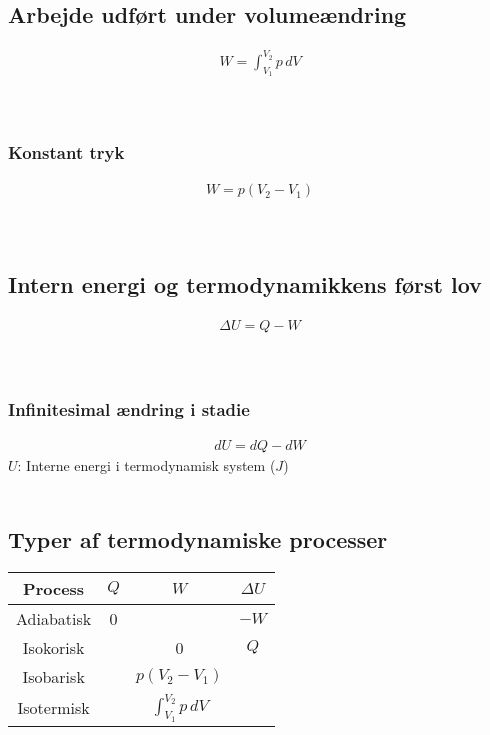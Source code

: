 \subsection{Arbejde udført under volumeændring}
	\begin{align}
		W=\int_{V_1}^{V_2}p\,dV
	\end{align}
	\arbejde\\
	\volumen\\
	\tryk

	\subsubsection{Konstant tryk}
		\begin{align}
			W=p(V_2-V_1)
		\end{align}
		\arbejde\\
		\tryk\\
		\volumen

\subsection{Intern energi og termodynamikkens først lov}
	\begin{align}
		\Delta U=Q-W
	\end{align}
	\internenergiendr\\
	\varme\\
	\arbejde

	\subsubsection{Infinitesimal ændring i stadie}
		\begin{align}
			dU=dQ-dW
		\end{align}
		$U$: Interne energi i termodynamisk system ($J$)\\
		\varme\\
		\arbejde
	
\subsection{Typer af termodynamiske processer}
	\begin{tabular}{|c|ccc|}
		\hline
		Process&$Q$&$W$&$\Delta U$\\
		\hline
		Adiabatisk&0&&$-W$\\
		Isokorisk&&0&$Q$\\
		Isobarisk&&$p(V_2-V_1)$&\\
		Isotermisk&&$\int_{V_1}^{V_2}p\,dV$&\\
		\hline
	\end{tabular}

